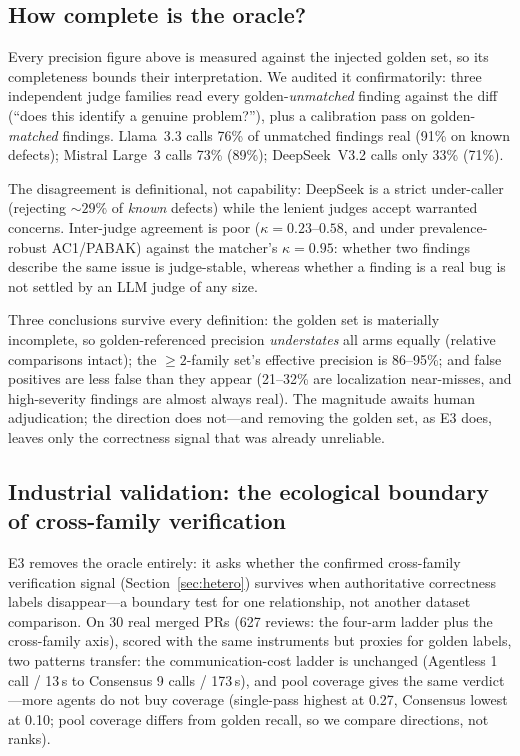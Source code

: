 \documentclass[conference]{IEEEtran}
\begin{document}
\subsection{How complete is the oracle?}
\label{sec:completeness}
Every precision figure above is measured against the injected golden set, so its
completeness bounds their interpretation. We audited it confirmatorily: three
independent judge families read every golden-\emph{unmatched} finding against the
diff (``does this identify a genuine problem?''), plus a calibration pass on
golden-\emph{matched} findings. Llama~3.3 calls 76\% of unmatched findings real
(91\% on known defects); Mistral Large~3 calls 73\% (89\%); DeepSeek~V3.2 calls
only 33\% (71\%).

The disagreement is definitional, not capability: DeepSeek is a strict
under-caller (rejecting ${\sim}29\%$ of \emph{known} defects) while the lenient
judges accept warranted concerns. Inter-judge agreement is poor
($\kappa{=}0.23$--$0.58$, and under prevalence-robust AC1/PABAK) against the
matcher's $\kappa{=}0.95$: whether two findings describe the same issue is
judge-stable, whereas whether a finding is a real bug is not settled by an LLM
judge of any size.

Three conclusions survive every definition: the golden set is materially
incomplete, so golden-referenced precision \emph{understates} all arms equally
(relative comparisons intact); the ${\geq}2$-family set's effective precision is
86--95\%; and false positives are less false than they appear (21--32\% are
localization near-misses, and high-severity findings are almost always real). The
magnitude awaits human adjudication; the direction does not---and removing the
golden set, as E3 does, leaves only the correctness signal that was already
unreliable.

\subsection{Industrial validation: the ecological boundary of cross-family
verification}
\label{sec:industrial}
E3 removes the oracle entirely: it asks whether the confirmed cross-family
verification signal (Section~\ref{sec:hetero}) survives when authoritative
correctness labels disappear---a boundary test for one relationship, not another
dataset comparison. On 30 real merged PRs (627 reviews: the four-arm ladder plus
the cross-family axis), scored with the same instruments but proxies for golden
labels, two patterns transfer: the communication-cost ladder is unchanged
(Agentless 1 call / 13\,s to Consensus 9 calls / 173\,s), and pool coverage gives
the same verdict---more agents do not buy coverage (single-pass highest at 0.27,
Consensus lowest at 0.10; pool coverage differs from golden recall, so we compare
directions, not ranks).
\end{document}
